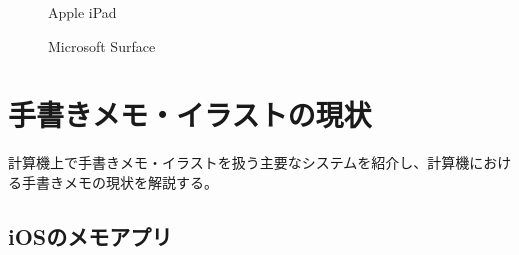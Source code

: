\begin{figure}[htbp] \begin{minipage}{0.5\hsize}
                         \begin{center} 
                         \end{center} \caption{Apple iPad} \label{fig:ipad}
\end{minipage} \begin{minipage}{0.5\hsize}
                   \begin{center} 
                   \end{center} \caption{Microsoft Surface} \label{fig:surface}
\end{minipage}
\end{figure}


\section{手書きメモ・イラストの現状}
計算機上で手書きメモ・イラストを扱う主要なシステムを紹介し、計算機における手書きメモの現状を解説する。

\subsection{iOSのメモアプリ}

